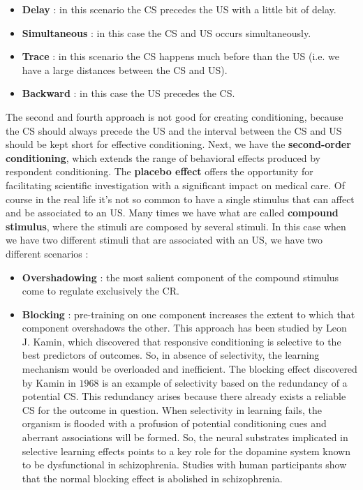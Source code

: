 \documentclass[11pt]{article}
\begin{document}
\begin{itemize}
\item \textbf{Delay} : in this scenario the CS precedes the US with a little bit of delay.
\item \textbf{Simultaneous} : in this case the CS and US occurs simultaneously.
\item \textbf{Trace} : in this scenario the CS happens much before than the US (i.e. we have a large distances between the CS and US).
\item \textbf{Backward} : in this case the US precedes the CS.
\end{itemize}

The second and fourth approach is not good for creating conditioning, because the CS should always precede the US and the interval between the CS and US should be kept short for effective conditioning. Next, we have the \textbf{second-order conditioning}, which extends the range of behavioral effects produced by respondent conditioning. The \textbf{placebo effect} offers the opportunity for facilitating scientific investigation with a significant impact on medical care. Of course in the real life it's not so common to have a single stimulus that can affect and be associated to an US. Many times we have what are called \textbf{compound stimulus}, where the stimuli are composed by several stimuli. In this case when we have two different stimuli that are associated with an US, we have two different scenarios :

\begin{itemize}
\item \textbf{Overshadowing} : the most salient component of the compound stimulus come to regulate exclusively the CR.
\item \textbf{Blocking} : pre-training on one component increases the extent to which that component overshadows the other. This approach has been studied by Leon J. Kamin, which discovered that responsive conditioning is selective to the best predictors of outcomes. So, in absence of selectivity, the learning mechanism would be overloaded and inefficient. The blocking effect discovered by Kamin in $1968$ is an example of selectivity based on the redundancy of a potential CS. This redundancy arises because there already exists a reliable CS for the outcome in question. When selectivity in learning fails, the organism is flooded with a profusion of potential conditioning cues and aberrant associations will be formed. So, the neural substrates implicated in selective learning effects points to a key role for the dopamine system known to be dysfunctional in schizophrenia. Studies with human participants show that the normal blocking effect is abolished in schizophrenia.  
\end{itemize}
\end{document}
